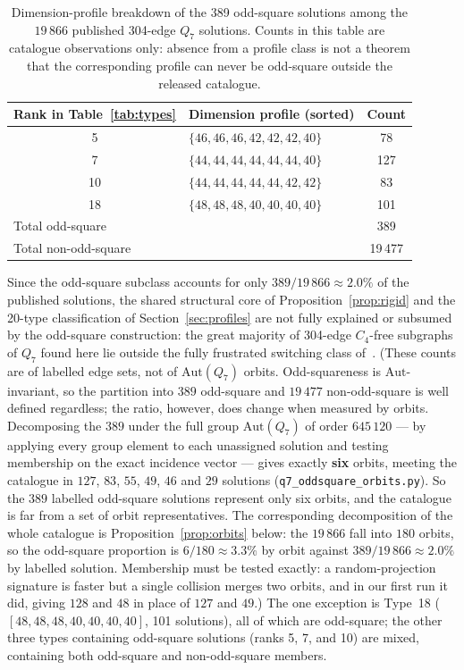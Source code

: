 \documentclass[12pt]{article}
\begin{document}
\begin{table}[ht]
\centering
\caption{Dimension-profile breakdown of the 389 odd-square solutions among
  the $19\,866$ published 304-edge $Q_7$ solutions. Counts in this table are
  catalogue observations only: absence from a profile class is not a theorem
  that the corresponding profile can never be odd-square outside the released
  catalogue.}
\label{tab:oddsquareaudit}\medskip
\begin{tabular}{clc}
\toprule
Rank in Table~\ref{tab:types} & Dimension profile (sorted) & Count\\
\midrule
 5 & $\{46,46,46,42,42,42,40\}$ & 78\\
 7 & $\{44,44,44,44,44,44,40\}$ & 127\\
10 & $\{44,44,44,44,44,42,42\}$ & 83\\
18 & $\{48,48,48,40,40,40,40\}$ & 101\\
\midrule
\multicolumn{2}{l}{Total odd-square} & 389\\
\multicolumn{2}{l}{Total non-odd-square} & 19\,477\\
\bottomrule
\end{tabular}
\end{table}

Since the odd-square subclass accounts for only $389/19\,866\approx2.0\%$ of
the published solutions, the shared structural core of
Proposition~\ref{prop:rigid} and the 20-type classification of
Section~\ref{sec:profiles} are not fully explained or subsumed by
the odd-square construction: the great majority of 304-edge $C_4$-free
subgraphs of $Q_7$ found here lie outside the fully frustrated switching
class of~\cite{DPTV79}. (These counts are of labelled edge sets, not of $\mathrm{Aut}(Q_7)$ orbits.
Odd-squareness is $\mathrm{Aut}$-invariant, so the partition into $389$
odd-square and $19\,477$ non-odd-square is well defined regardless; the ratio,
however, does change when measured by orbits. Decomposing the $389$ under the
full group $\mathrm{Aut}(Q_7)$ of order $645\,120$ --- by applying every group
element to each unassigned solution and testing membership on the exact
incidence vector --- gives exactly \textbf{six} orbits, meeting the catalogue in
$127$, $83$, $55$, $49$, $46$ and $29$ solutions
(\texttt{q7\_oddsquare\_orbits.py}). So the $389$ labelled odd-square solutions
represent only six orbits, and the catalogue is far from a set of orbit
representatives. The corresponding decomposition of the whole catalogue is
Proposition~\ref{prop:orbits} below: the $19\,866$ fall into $180$ orbits, so
the odd-square proportion is $6/180\approx3.3\%$ by orbit against
$389/19\,866\approx2.0\%$ by labelled solution. Membership must be tested exactly: a
random-projection signature is faster but a single collision merges two orbits,
and in our first run it did, giving $128$ and $48$ in place of $127$ and $49$.) The one exception is Type~18
($[48,48,48,40,40,40,40]$, 101 solutions), all of which are odd-square;
the other three types containing odd-square solutions (ranks 5, 7, and
10) are mixed, containing both odd-square and non-odd-square members.
\end{document}
